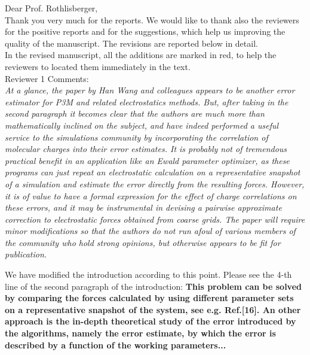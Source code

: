 \documentclass[a4paper]{article}
\begin{document}
\noindent
Dear Prof. Rothlisberger,\\

Thank you very much for the reports. We would like to thank also the
reviewers for the positive reports and for the suggestions, which help
us improving the quality of the manuscript. The revisions are
reported below in detail.\\

In the revised manuscript, all the additions are marked in red, to help the
reviewers to located them immediately in the text.\\

\noindent
Reviewer  1 Comments:\\

\textit{ At a glance, the paper by Han Wang and colleagues appears to
  be another error estimator for P3M and related electrostatics
  methods.  But, after taking in the second paragraph it becomes clear
  that the authors are much more than mathematically inclined on the
  subject, and have indeed performed a useful service to the
  simulations community by incorporating the correlation of molecular
  charges into their error estimates.  It is probably not of
  tremendous practical benefit in an application like an Ewald
  parameter optimizer, as these programs can just repeat an
  electrostatic calculation on a representative snapshot of a
  simulation and estimate the error directly from the resulting
  forces.  However, it is of value to have a formal expression for the
  effect of charge correlations on these errors, and it may be
  instrumental in devising a pairwise approximate correction to
  electrostatic forces obtained from coarse grids.  The paper will
  require minor modifications so that the authors do not run afoul of
  various members of the community who hold strong opinions, but
  otherwise appears to be fit for publication.
}

We have modified the introduction according to this point.
Please see the 4-th line of the second paragraph of the introduction:
\textbf{
  This problem can be solved by  comparing
  the forces calculated by
  using different parameter sets
  on a representative snapshot of the system,
  see e.g. Ref.[16].
An other approach is the 
  in-depth theoretical study
of the error introduced by the algorithms, namely the
error estimate,
by which the error is described by a function of the working
parameters...
}\\
\end{document}
